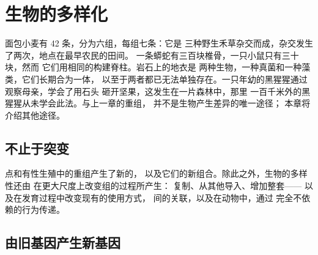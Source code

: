 \chapter{生物的多样化}\label{ch:g12:diversification-of-life}

面包小麦有 42 条，分为六组，每组七条：它是
三种野生禾草杂交而成，杂交发生了两次，地点在最早农民的田间。
一条蟒蛇有三百块椎骨，一只小鼠只有三十块，然而
它们用相同的构建脊柱。岩石上的地衣是
两种生物，一种真菌和一种藻类，它们长期合为一体，
以至于两者都已无法单独存在。一只年幼的黑猩猩通过观察母亲，学会了用石头
砸开坚果，这发生在一片森林中，那里
一百千米外的黑猩猩从未学会此法。与上一章的重组，
并不是生物产生差异的唯一途径；
本章将介绍其他途径。

\section{不止于突变}

\begin{proposition}[多样化的来源]\label{prop:g12:diversification-of-life:sources}
点和有性生殖中的重组产生了新的，
以及它们的新组合。除此之外，生物的多样性还由
在更大尺度上改变组的过程所产生：
复制、从其他导入、增加整套——
以及在发育过程中改变现有的使用方式，
间的关联，以及在动物中，通过
完全不依赖的行为传递。
\end{proposition}
\admitted

\section{由旧基因产生新基因}

